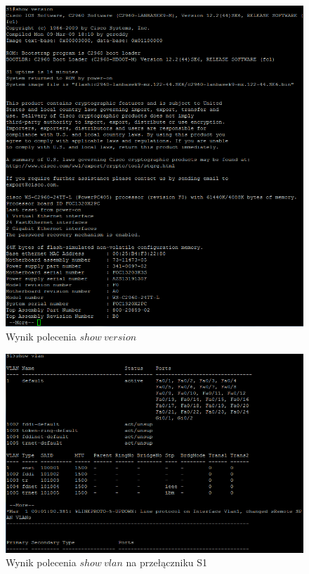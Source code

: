 \documentclass[wide,a4paper,titlepage,12pt] {article}
\begin{document}
  \begin{figure}[htbp]
    \begin{center}
      \includegraphics[width=\textwidth]{img/t3.PNG}
      \caption{Wynik polecenia $show\ version$}
    \end{center}
  \end{figure}

  \begin{figure}[htbp]
    \begin{center}
      \includegraphics[width=\textwidth]{img/t4.PNG}
      \caption{Wynik polecenia $show\ vlan$ na przełączniku S1}
    \end{center}
  \end{figure}
\end{document}
